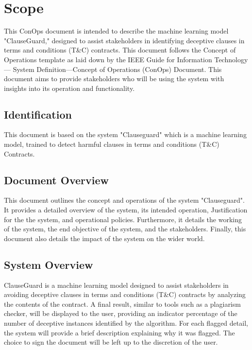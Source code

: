 \chapter{Scope \\
\label{Chapter::Scope}}
This ConOps \cite{DMuresanConOps} document is intended to describe the machine learning model "ClauseGuard," designed to assist stakeholders in identifying deceptive clauses in terms and conditions (T\&C) contracts. This document follows the Concept of Operations template as laid down by the IEEE Guide for Information Technology—
System Definition—Concept of
Operations (ConOps) Document. This document aims to provide stakeholders who will be using the system with insights into its operation and functionality. 


\section{Identification\label{Section::Project Identification} }
This document is based on the system "Clauseguard" which is a machine learning model, trained to detect harmful clauses in terms and conditions (T\&C) Contracts.



\section { Document Overview \label{Section::Document Overview} }
This document outlines the concept and operations of the system "Clauseguard". It provides a detailed overview of the system, its intended operation, Justification for the the system, and operational policies. Furthermore, it details the working of the system, the end objective of the system, and the stakeholders. Finally, this document also details the impact of the system on the wider world. 


\section{System Overview\label{Section::System Overview}}

ClauseGuard is a machine learning model designed to assist stakeholders in avoiding deceptive clauses in terms and conditions (T\&C) contracts by analyzing the contents of the contract. A final result, similar to tools such as a plagiarism checker, will be displayed to the user, providing an indicator percentage of the number of deceptive instances identified by the algorithm. For each flagged detail, the system will provide a brief description explaining why it was flagged. The choice to sign the document will be left up to the discretion of the user.

